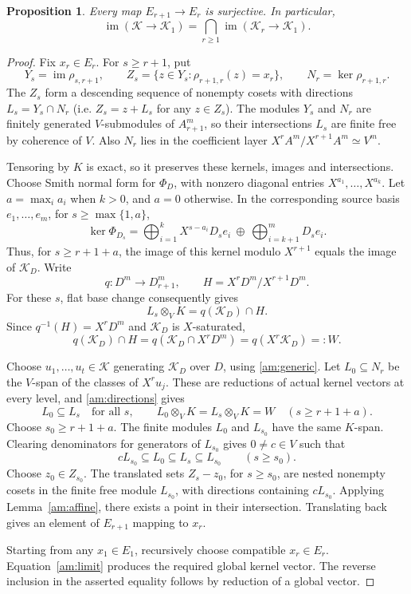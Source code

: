 \documentclass[12pt]{amsart}
\newtheorem{proposition}[theorem]{Proposition}
\theoremstyle{plain}
\begin{document}
\begin{proposition}\label{am:lifting}
Every map $E_{r+1}\to E_r$ is surjective. In particular,
\[
\operatorname{im}(\mathcal K\to\mathcal K_1)
=\bigcap_{r\ge1}\operatorname{im}(\mathcal K_r\to\mathcal K_1).
\]
\end{proposition}

\begin{proof}
Fix $x_r\in E_r$. For $s\ge r+1$, put
\[
Y_s=\operatorname{im}\rho_{s,r+1},\qquad
Z_s=\{z\in Y_s:\rho_{r+1,r}(z)=x_r\},
\qquad N_r=\ker\rho_{r+1,r}.
\]
The $Z_s$ form a descending sequence of nonempty cosets with directions
$L_s=Y_s\cap N_r$ (i.e. $Z_s=z+L_s$ for any $z\in Z_s$). The modules $Y_s$ and $N_r$ are finitely generated
$V$-submodules of $A_{r+1}^m$, so their intersections $L_s$ are finite
free by coherence of $V$. Also $N_r$ lies in the coefficient layer
$X^rA^m/X^{r+1}A^m\simeq V^m$.

Tensoring by $K$ is exact, so it preserves these kernels, images and
intersections. Choose Smith normal form for $\Phi_D$, with nonzero
diagonal entries $X^{a_1},\ldots,X^{a_k}$. Let
$a=\max_i a_i$ when $k>0$, and $a=0$ otherwise. In the corresponding
source basis $e_1,\ldots,e_m$, for $s\ge\max\{1,a\}$,
\[
\ker\Phi_{D_s}
=\bigoplus_{i=1}^k X^{s-a_i}D_s e_i
 \ \oplus\ \bigoplus_{i=k+1}^m D_s e_i.
\]
Thus, for $s\ge r+1+a$, the image of this kernel modulo $X^{r+1}$
equals the image of $\mathcal K_D$. Write
\[
q:D^m\to D_{r+1}^m,\qquad
H=X^rD^m/X^{r+1}D^m.
\]
For these $s$, flat base change consequently gives
\[
L_s\otimes_V K=q(\mathcal K_D)\cap H.
\]
Since $q^{-1}(H)=X^rD^m$ and $\mathcal K_D$ is $X$-saturated,
\begin{equation}\label{am:directions}
q(\mathcal K_D)\cap H
=q(\mathcal K_D\cap X^rD^m)
=q(X^r\mathcal K_D)=:W.
\end{equation}


Choose $u_1,\ldots,u_t\in\mathcal K$ generating $\mathcal K_D$ over
$D$, using \eqref{am:generic}. Let $L_0\subseteq N_r$ be the $V$-span
of the classes of $X^r u_j$. These are reductions of actual kernel
vectors at every level, and \eqref{am:directions} gives
\[
L_0\subseteq L_s\quad\text{for all }s,\qquad
L_0\otimes_V K=L_s\otimes_V K=W\quad(s\ge r+1+a).
\]
Choose $s_0\ge r+1+a$. The finite modules $L_0$ and $L_{s_0}$
have the same $K$-span. Clearing denominators for generators of
$L_{s_0}$ gives $0\ne c\in V$ such that
\[
cL_{s_0}\subseteq L_0\subseteq L_s\subseteq L_{s_0}
\qquad(s\ge s_0).
\]
Choose $z_0\in Z_{s_0}$. The translated sets $Z_s-z_0$, for $s\ge s_0$,
are nested nonempty cosets in the finite free module $L_{s_0}$, with
directions containing $cL_{s_0}$. Applying Lemma~\ref{am:affine}, there exists a point in their intersection. Translating back gives an element of
$E_{r+1}$ mapping to $x_r$.

Starting from any $x_1\in E_1$, recursively choose compatible
$x_r\in E_r$. Equation~\eqref{am:limit} produces the required global
kernel vector. The reverse inclusion in the asserted equality follows
by reduction of a global vector.
\end{proof}
\end{document}
